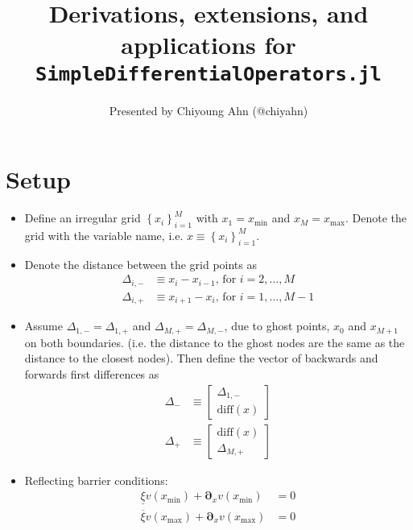\documentclass[11pt]{article}
\newcommand{\D}[1][]{\ensuremath{\boldsymbol{\partial}_{#1}}}
\newcommand{\set}[1]{\ensuremath{\left\{{#1}\right\}}}
\begin{document}
\title{Derivations, extensions, and applications for \texttt{SimpleDifferentialOperators.jl}}
\author{Presented by Chiyoung Ahn (@chiyahn)}
\maketitle

\section{Setup}

\begin{itemize}
	\item Define an irregular grid $\set{x_i}_{i=1}^M$ with $x_1 = {x_{\min}}$ and $x_{M} = {x_{\max}}$. Denote the grid with the variable name, i.e. $x \equiv \set{x_i}_{i=1}^M$.
	\item Denote the distance between the grid points as
	\begin{align}
	\Delta_{i,-} &\equiv x_i - x_{i-1},\, \text{for } i = 2,\ldots, M\\
	\Delta_{i,+} &\equiv x_{i+1} - x_i,\, \text{for } i = 1,\ldots, M-1
	\end{align}
	
	\item Assume $\Delta_{1, -} = \Delta_{1, +}$ and $\Delta_{M, +} = \Delta_{M, -}$, due to ghost points, $x_0$ and $x_{M+1}$ on both boundaries. (i.e. the distance to the ghost nodes are the same as the distance to the closest nodes).  Then define the vector of backwards and forwards first differences as
	\begin{align}
	\Delta_{-} &\equiv \begin{bmatrix} \Delta_{1,-} \\
	\text{diff}(x)
	\end{bmatrix}\\
	\Delta_{+} &\equiv \begin{bmatrix} \text{diff}(x)\\
	\Delta_{M,+}
	\end{bmatrix}
	\end{align}
	\item Reflecting barrier conditions:
	\begin{align}
	\underline{\xi} v({x_{\min}}) + \D[x]v({x_{\min}} ) &= 0\label{eq:new-BC1}\\
	\overline{\xi} v({x_{\max}}) + \D[x]v({x_{\max}}) &= 0\label{eq:new-BC2}
	\end{align}
\end{itemize}
\end{document}
